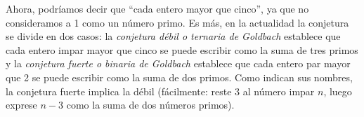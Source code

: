 
Ahora, podríamos decir que ``cada entero mayor que cinco'', ya que no consideramos a 1 como un número primo. Es más, en la actualidad la conjetura se divide en dos casos: la \emph{conjetura débil o ternaria de Goldbach} establece que cada entero impar mayor que cinco se puede escribir como la suma de tres primos y la \emph{conjetura fuerte o binaria de Goldbach} establece que cada entero par mayor que 2 se puede escribir como la suma de dos primos. Como indican sus nombres, la conjetura fuerte implica la débil (fácilmente: reste 3 al número impar $n$, luego exprese $n-3$ como la suma de dos números primos).

\begin{figure}[H]
	\centering
	\def\svgwidth{7cm}
		
\end{figure}

